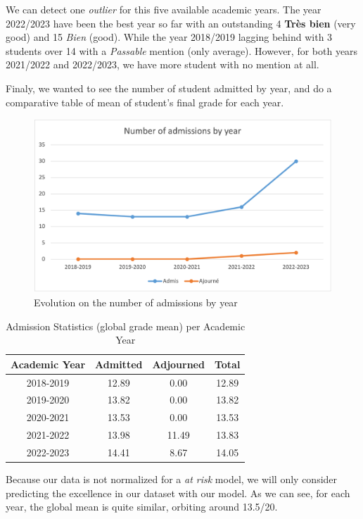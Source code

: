 \documentclass[../main.tex]{subfiles}
\begin{document}
We can detect one \textit{outlier} for this five available academic years. The year 2022/2023 have been the best year so far with an outstanding 4 \textbf{Très bien} (very good) and 15 \textit{Bien} (good). While the year 2018/2019 lagging behind with 3 students over 14 with a \textit{Passable} mention (only average). However, for both years 2021/2022 and 2022/2023, we have more student with no mention at all.

Finaly, we wanted to see the number of student admitted by year, and do a comparative table of mean of student's final grade for each year. 
\begin{figure}[H]      
    \includegraphics[width=1\linewidth]{res/graph/data_analysis/raw/nbadmissions_year.png}
    \caption{Evolution on the number of admissions by year}
    \label{fig:evol_nb_admis}
\end{figure}
\begin{table}[H]
  \centering
  \caption{Admission Statistics (global grade mean) per Academic Year}
  \begin{tabular}{|c|c|c|c|}
    \hline
    Academic Year & Admitted & Adjourned & Total \\
    \hline
    2018-2019 & 12.89 & 0.00 & 12.89 \\
    2019-2020 & 13.82 & 0.00 & 13.82 \\
    2020-2021 & 13.53 & 0.00 & 13.53 \\
    2021-2022 & 13.98 & 11.49 & 13.83 \\
    2022-2023 & 14.41 & 8.67 & 14.05 \\
    \hline
  \end{tabular}
  
  \label{tab:admission_statistics}
\end{table}

Because our data is not normalized for a \textit{at risk} model, we will only consider predicting the excellence in our dataset with our model.
As we can see, for each year, the global mean is quite similar, orbiting around 13.5/20.
\end{document}

